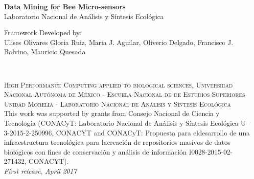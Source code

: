\documentclass[11pt,fleqn]{book} %
\begin{document}

\begingroup
\thispagestyle{empty}
\centering
\vspace*{4cm}
\par\normalfont\fontsize{35}{35}\sffamily\selectfont
\textbf{\color{white}Data Mining for Bee Micro-sensors}\\
{\Huge\color{white} Laboratorio Nacional de Análisis y Síntesis Ecológica}\par %
\vspace*{0.2cm}
{\LARGE\color{white} Framework Developed by:\\ Ulises Olivares Gloria Ruiz, Maria J. Aguilar, Oliverio Delgado, Francisco J. Balvino, Mauricio Quesada }\par %
\endgroup


\newpage
~\vfill
\thispagestyle{empty}


\noindent \textsc{High Performance Computing applied to biological sciences, Universidad Nacional Autónoma de México - Escuela Nacional de de Estudios Superiores Unidad Morelia - Laboratorio Nacional de Análisis y Síntesis Ecológica }\\

\noindent  This work was supported by grants from Consejo Nacional de Ciencia y Tecnología (CONACyT: Laboratorio Nacional de Análisis y Síntesis Ecológica U-3-2015-2-250996, CONACYT and CONACyT: Propuesta para eldesarrollo de una infraestructura tecnológica para lacreación de repositorios masivos de datos biológicos con fines de conservación y análisis de información I0028-2015-02-271432, CONACYT).\\ %

\noindent \textit{First release, April 2017} %
\end{document}
